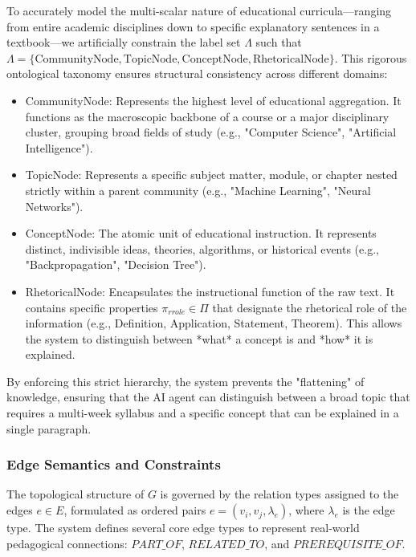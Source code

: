 To accurately model the multi-scalar nature of educational curricula—ranging from entire academic disciplines down to specific explanatory sentences in a textbook—we artificially constrain the label set $\Lambda$ such that $\Lambda = \{ \text{CommunityNode}, \text{TopicNode}, \text{ConceptNode}, \text{RhetoricalNode} \}$. This rigorous ontological taxonomy ensures structural consistency across different domains:

\begin{itemize}
    \item {CommunityNode}: Represents the highest level of educational aggregation. It functions as the macroscopic backbone of a course or a major disciplinary cluster, grouping broad fields of study (e.g., "Computer Science", "Artificial Intelligence").
    \item {TopicNode}: Represents a specific subject matter, module, or chapter nested strictly within a parent community (e.g., "Machine Learning", "Neural Networks").
    \item {ConceptNode}: The atomic unit of educational instruction. It represents distinct, indivisible ideas, theories, algorithms, or historical events (e.g., "Backpropagation", "Decision Tree").
    \item {RhetoricalNode}: Encapsulates the instructional function of the raw text. It contains specific properties $\pi_{rrole} \in \Pi$ that designate the rhetorical role of the information (e.g.,  {Definition},  {Application},  {Statement},  {Theorem}). This allows the system to distinguish between *what* a concept is and *how* it is explained.
\end{itemize}

By enforcing this strict hierarchy, the system prevents the "flattening" of knowledge, ensuring that the AI agent can distinguish between a broad topic that requires a multi-week syllabus and a specific concept that can be explained in a single paragraph.

\subsubsection{Edge Semantics and Constraints}

The topological structure of $G$ is governed by the relation types assigned to the edges $e \in E$, formulated as ordered pairs $e = (v_i, v_j, \lambda_e)$, where $\lambda_e$ is the edge type. The system defines several core edge types to represent real-world pedagogical connections: $ {PART\_OF}$, $ {RELATED\_TO}$, and $ {PREREQUISITE\_OF}$.

